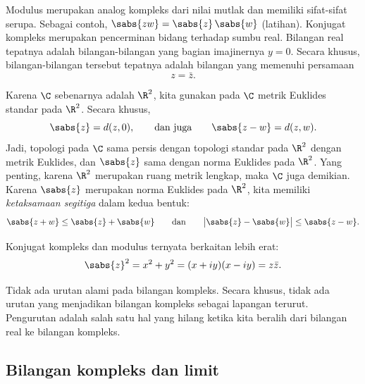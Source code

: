 Modulus merupakan analog kompleks dari nilai mutlak dan
memiliki sifat-sifat serupa.
Sebagai contoh,
$\sabs{zw} = \sabs{z} \, \sabs{w}$ (latihan).
Konjugat kompleks merupakan pencerminan bidang terhadap sumbu real.
Bilangan real tepatnya adalah bilangan-bilangan yang bagian imajinernya
$y=0$. Secara khusus, bilangan-bilangan tersebut tepatnya adalah
bilangan yang memenuhi persamaan
\begin{equation*}
z = \bar{z} .
\end{equation*}

Karena $\C$ sebenarnya adalah $\R^2$, kita gunakan pada $\C$ metrik
Euklides standar pada $\R^2$.
Secara khusus,
\begin{equation*}
\sabs{z} = d(z,0) , \qquad 
\text{dan juga} \qquad 
\sabs{z-w} = d(z,w) .
\end{equation*}
Jadi, topologi pada $\C$ sama persis dengan topologi standar pada $\R^2$
dengan metrik Euklides,
dan $\sabs{z}$ sama dengan norma Euklides pada $\R^2$.
Yang penting, karena $\R^2$ merupakan ruang metrik lengkap, maka
$\C$ juga demikian.
Karena $\sabs{z}$ merupakan norma Euklides pada $\R^2$, kita memiliki
\emph{ketaksamaan segitiga}
dalam kedua bentuk:
\begin{equation*}
\sabs{z+w} \leq \sabs{z}+\sabs{w} \qquad \text{dan} \qquad
\big\lvert \sabs{z}-\sabs{w} \big\rvert \leq \sabs{z-w} .
\end{equation*}

Konjugat kompleks dan modulus ternyata berkaitan lebih erat:
\begin{equation*}
\sabs{z}^2 =
x^2+y^2 =
(x+iy)(x-iy) =
z \bar{z} .
\end{equation*}

\begin{remark}
Tidak ada urutan alami pada bilangan kompleks.
Secara khusus,
tidak ada urutan yang menjadikan bilangan kompleks sebagai lapangan terurut.
Pengurutan adalah salah satu hal yang hilang ketika kita beralih dari bilangan real
ke bilangan kompleks.
\end{remark}

\subsection{Bilangan kompleks dan limit}

